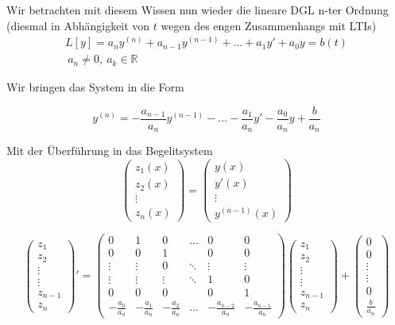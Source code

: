 \documentclass[10pt,a4paper]{article}
\begin{document}
Wir betrachten mit diesem Wissen nun wieder die lineare DGL n-ter Ordnung (diesmal in Abhängigkeit von $t$ wegen des engen Zusammenhangs mit LTIs)
\begin{eqnarray}
L[y] = a_n y^{(n)}+ a_{n-1} y^{(n-1)} + ... + a_1 y' + a_0 y=b(t) \\
 ~a_n \not= 0,~ a_k \in \mathbb{R}
\end{eqnarray}

Wir bringen das System in die Form

\begin{equation}
y^{(n)} = -\frac{a_{n-1}}{a_n} y^{(n-1)} - \ldots -\frac{a_1}{a_n} y' -\frac{a_0}{a_n} y + \frac{b}{a_n}
\end{equation}


Mit der Überführung in das Begelitsystem
\begin{equation}
\begin{pmatrix}
z_1(x) \\
z_2(x)\\
\vdots\\
z_n(x)
\end{pmatrix} = 
\begin{pmatrix}
y(x) \\
y'(x) \\
\vdots\\
y^{(n-1)}(x)
\end{pmatrix}
\end{equation}



\begin{equation}
\begin{pmatrix} z_1 \\ z_2 \\ \vdots \\ \vdots \\ z_{n-1} \\ z_n \end{pmatrix}' = 
\begin{pmatrix}
0  &1 	& 0		& \ldots	& 0 & 0\\
0  &0  	& 1 	&			& 0 & 0\\
\vdots  &\vdots	& 0 	& \ddots & \vdots &\vdots \\
\vdots  &\vdots  &\vdots  &\ddots &1 & 0\\
0  &0	& 0& 	& 0 & 1\\
-\frac{a_0}{a_n}  &-\frac{a_1}{a_n}		&   -\frac{a_2}{a_n}		& \ldots & -\frac{a_{n-2}}{a_n}& -\frac{a_{n-1}}{a_n}
\end{pmatrix}
\begin{pmatrix} z_1 \\ z_2 \\\vdots \\ \vdots \\ z_{n-1} \\ z_n \end{pmatrix} + 
\begin{pmatrix} 0 \\ 0 \\ \vdots \\  \vdots \\ 0 \\ \frac{b}{a_n} \end{pmatrix}
\end{equation}
\end{document}
